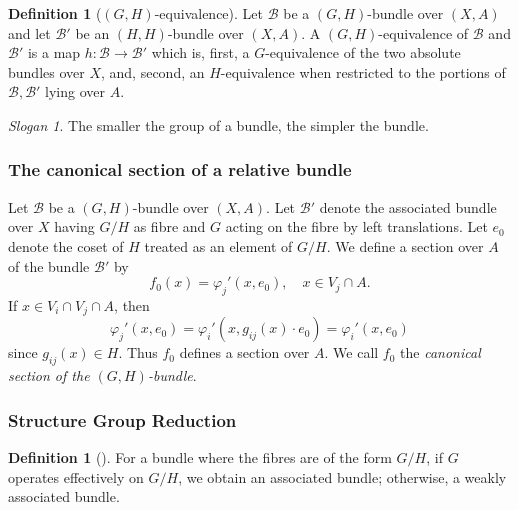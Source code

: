 \documentclass[reqno]{amsart}
\theoremstyle{definition}
\newtheorem{definition}[theorem]{Definition}
\theoremstyle{remark}
\newtheorem*{slogan}{Slogan}
\begin{document}
    \begin{definition}[$(G,H)$-equivalence]
        Let $\mathcal{B}$ be a 
        $\left( G,H \right) $-bundle over
        $(X,A)$ and let
        $\mathcal{B}'$ be an 
        $\left( H,H \right) $-bundle over
        $(X,A)$. A $\left( G,H \right) $-equivalence
        of $\mathcal{B}$ and $\mathcal{B}'$ is a map
        $h \colon \mathcal{B}\to \mathcal{B}'$ which is,
        first, a $G$-equivalence of the two absolute
        bundles over $X$, and, second, an
        $H$-equivalence when restricted to the 
        portions of $\mathcal{B},\mathcal{B}'$ lying over $A$.
    \end{definition}


    \begin{slogan}
        The smaller the group of a bundle, the simpler
        the bundle.
    \end{slogan}

    \subsubsection{The canonical section of
    a relative bundle}

    Let $\mathcal{B}$ be a 
    $\left( G,H \right) $-bundle over
    $(X,A)$. Let
    $\mathcal{B}'$ denote the associated bundle over
    $X$ having $G /H$ as fibre and $G$ acting
    on the fibre by left translations.
    Let $e_0$ denote the coset
    of $H$ treated as an element of $G /H$.
    We define a section over $A$ of the bundle
    $\mathcal{B}'$ by
    \[
    f_0(x) = \varphi_j' (x,e_0), \quad x \in V_j \cap A.
    \] 
    If $x \in V_i \cap V_j \cap A$, then
    \[
    \varphi_j'(x,e_0) = 
    \varphi_i'\left( x, g_{ij}(x) \cdot e_0 \right) 
    = \varphi_i' (x, e_0)
    \] 
    since $g_{ij}(x) \in H$. Thus
    $f_0$ defines a section over $A$.
    We call $f_0$ the \textit{canonical section of the
    $(G,H)$-bundle}.



    \subsubsection{Structure Group Reduction}


    \begin{definition}[]
        For a bundle where  the fibres are
        of the form $G /H$, if
        $G$ operates effectively on
        $G /H$, we obtain an associated bundle;
        otherwise, a weakly associated bundle.
    \end{definition}
\end{document}
